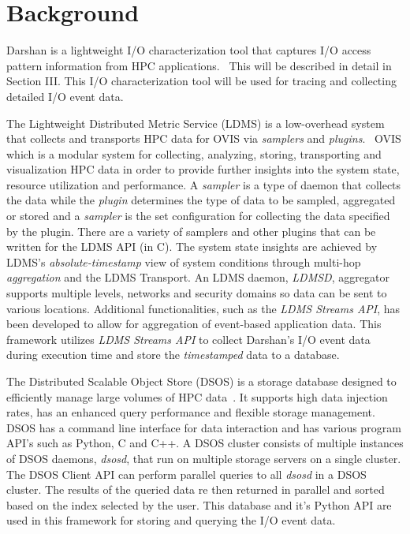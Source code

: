 \section{Background}
\label{sec:background}
Darshan is a lightweight I/O characterization tool that captures I/O access pattern information from HPC applications.~\cite{Darshan} This will be described in detail in Section III. This I/O characterization tool will be used for tracing and collecting detailed I/O event data.

The Lightweight Distributed Metric Service (LDMS) is a low-overhead system that collects and transports HPC data for OVIS via \emph{samplers} and \emph{plugins}.~\cite{ovisweb} OVIS which is a modular system for collecting, analyzing, storing, transporting and visualization HPC data in order to provide further insights into the system state, resource utilization and performance. A \emph{sampler} is a type of daemon that collects the data while the \emph{plugin} determines the type of data to be sampled, aggregated or stored and a \emph{sampler} is the set configuration for collecting the data specified by the plugin. There are a variety of samplers and other plugins that can be written for the LDMS API (in C). The system state insights are achieved by LDMS's \emph{absolute-timestamp} view of system conditions through multi-hop \emph{aggregation} and the LDMS Transport. An LDMS daemon, \emph{LDMSD}, aggregator supports multiple levels, networks and security domains so data can be sent to various locations. Additional functionalities, such as the \emph{LDMS Streams API}, has been developed to allow for aggregation of event-based application data. This framework utilizes \emph{LDMS Streams API} to collect Darshan's I/O event data during execution time and store the \emph{timestamped} data to a database.

The Distributed Scalable Object Store (DSOS) is a storage database designed to efficiently manage large volumes of HPC data~\cite{sosgithub}. It supports high data injection rates, has an enhanced query performance and flexible storage management. DSOS has a command line interface for data interaction and has various program API's such as Python, C and C++. A DSOS cluster consists of multiple instances of DSOS daemons, \emph{dsosd}, that run on multiple storage servers on a single cluster. The DSOS Client API can perform parallel queries to all \emph{dsosd} in a DSOS cluster. The results of the queried data re then returned in parallel and sorted based on the index selected by the user. This database and it's Python API are used in this framework for storing and querying the I/O event data. 

